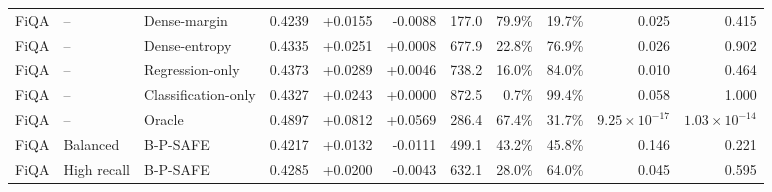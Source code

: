 \begin{table}[!htbp]
\begin{tabular}{lllrrrrrrrr}
FiQA & -- & Dense-margin & 0.4239 & +0.0155 & -0.0088 & 177.0 & 79.9\% & 19.7\% & 0.025 & 0.415 \\
FiQA & -- & Dense-entropy & 0.4335 & +0.0251 & +0.0008 & 677.9 & 22.8\% & 76.9\% & 0.026 & 0.902 \\
FiQA & -- & Regression-only & 0.4373 & +0.0289 & +0.0046 & 738.2 & 16.0\% & 84.0\% & 0.010 & 0.464 \\
FiQA & -- & Classification-only & 0.4327 & +0.0243 & +0.0000 & 872.5 & 0.7\% & 99.4\% & 0.058 & 1.000 \\
FiQA & -- & Oracle & 0.4897 & +0.0812 & +0.0569 & 286.4 & 67.4\% & 31.7\% & $9.25\!\times\!10^{-17}$ & $1.03\!\times\!10^{-14}$ \\
FiQA & Balanced & B-P-SAFE & 0.4217 & +0.0132 & -0.0111 & 499.1 & 43.2\% & 45.8\% & 0.146 & 0.221 \\
FiQA & High recall & B-P-SAFE & 0.4285 & +0.0200 & -0.0043 & 632.1 & 28.0\% & 64.0\% & 0.045 & 0.595 \\
\bottomrule
\end{tabular}
\end{table}
